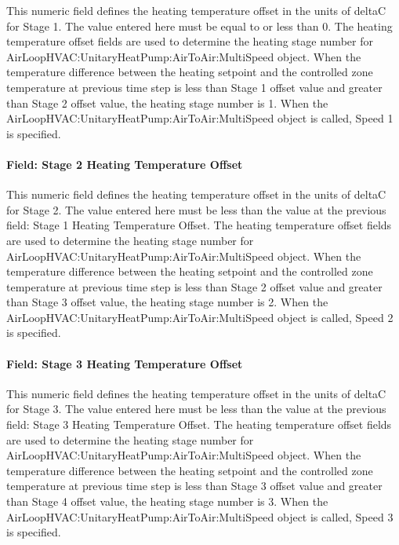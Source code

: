 This numeric field defines the heating temperature offset in the units of deltaC for Stage 1. The value entered here must be equal to or less than 0. The heating temperature offset fields are used to determine the heating stage number for AirLoopHVAC:UnitaryHeatPump:AirToAir:MultiSpeed object. When the temperature difference between the heating setpoint and the controlled zone temperature at previous time step is less than Stage 1 offset value and greater than Stage 2 offset value, the heating stage number is 1. When the AirLoopHVAC:UnitaryHeatPump:AirToAir:MultiSpeed object is called, Speed 1 is specified.

\paragraph{Field: Stage 2 Heating Temperature Offset}\label{field-stage-2-heating-temperature-offset}

This numeric field defines the heating temperature offset in the units of deltaC for Stage 2. The value entered here must be less than the value at the previous field: Stage 1 Heating Temperature Offset. The heating temperature offset fields are used to determine the heating stage number for AirLoopHVAC:UnitaryHeatPump:AirToAir:MultiSpeed object. When the temperature difference between the heating setpoint and the controlled zone temperature at previous time step is less than Stage 2 offset value and greater than Stage 3 offset value, the heating stage number is 2. When the AirLoopHVAC:UnitaryHeatPump:AirToAir:MultiSpeed object is called, Speed 2 is specified.

\paragraph{Field: Stage 3 Heating Temperature Offset}\label{field-stage-3-heating-temperature-offset}

This numeric field defines the heating temperature offset in the units of deltaC for Stage 3. The value entered here must be less than the value at the previous field: Stage 3 Heating Temperature Offset. The heating temperature offset fields are used to determine the heating stage number for AirLoopHVAC:UnitaryHeatPump:AirToAir:MultiSpeed object. When the temperature difference between the heating setpoint and the controlled zone temperature at previous time step is less than Stage 3 offset value and greater than Stage 4 offset value, the heating stage number is 3. When the AirLoopHVAC:UnitaryHeatPump:AirToAir:MultiSpeed object is called, Speed 3 is specified.

